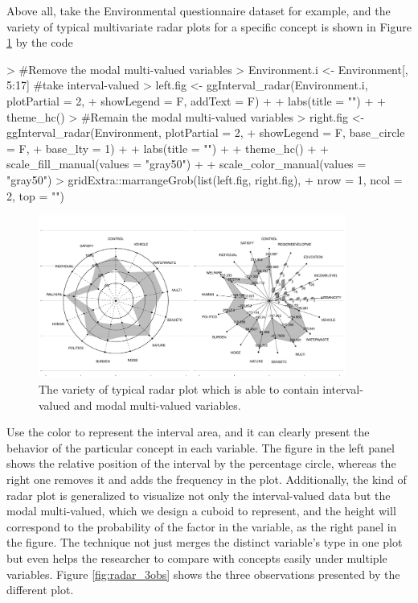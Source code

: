\documentclass[article]{jss}
\begin{document}
Above all, take the Environmental questionnaire dataset for example, and the variety of typical multivariate radar plots for a specific concept is shown in Figure \ref{fig:radar_typical} by the code

\begin{Schunk}
\begin{Sinput}
> #Remove the modal multi-valued variables
> Environment.i <- Environment[, 5:17] #take interval-valued
> left.fig <- ggInterval_radar(Environment.i, plotPartial = 2,
+                              showLegend = F, addText = F) +
+             labs(title = "") +
+             theme_hc() 
> #Remain the modal multi-valued variables
> right.fig <- ggInterval_radar(Environment, plotPartial = 2,
+                               showLegend = F, base_circle = F,
+                               base_lty = 1) +
+              labs(title = "") +
+              theme_hc() +
+              scale_fill_manual(values = "gray50") +
+              scale_color_manual(values = "gray50") 
> gridExtra::marrangeGrob(list(left.fig, right.fig), 
+                         nrow = 1, ncol = 2, top = "")
\end{Sinput}
\end{Schunk}

\begin{figure}[htbp]
\centering
\includegraphics[width=0.9\textwidth]{radar_typical.pdf} 
\caption{\label{fig:radar_typical} The variety of typical radar plot which is able to contain interval-valued and modal multi-valued variables.}
\end{figure}

Use the color to represent the interval area, and it can clearly present the behavior of the particular concept in each variable. The figure in the left panel shows the relative position of the interval by the percentage circle, whereas the right one removes it and adds the frequency in the plot. Additionally, the kind of radar plot is generalized to visualize not only the interval-valued data but the modal multi-valued, which we design a cuboid to represent, and the height will correspond to the probability of the factor in the variable, as the right panel in the figure. The technique not just merges the distinct variable's type in one plot but even helps the researcher to compare with concepts easily under multiple variables. Figure \ref{fig:radar_3obs} shows the three observations presented by the different plot. 
\end{document}

